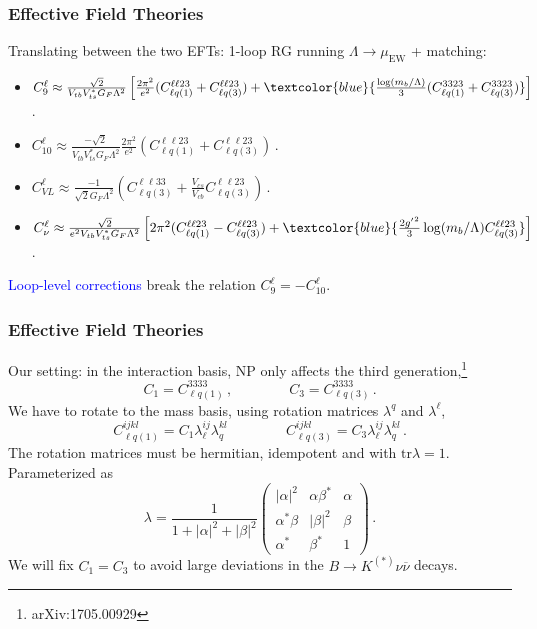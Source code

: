 \documentclass[mathserif, 10pt]{beamer}
\begin{document}
\begin{frame}
    \frametitle{Effective Field Theories}
    Translating between the two EFTs: 1-loop RG running $\Lambda \to \mu_\mathrm{EW}$ + matching:
    \begin{itemize}
        \item {\small $C_9^\ell \approx \frac{\sqrt{2}}{V_{tb}V_{ts}^* G_F \Lambda^2}\left[ \frac{2\pi^2}{e^2}(C_{\ell q(1)}^{\ell\ell23}+C_{\ell q(3)}^{\ell\ell23}) + \textcolor{blue}{\frac{\log(m_b/\Lambda)}{3}(C_{\ell q(1)}^{3323}+C_{\ell q(3)}^{3323})}\right]\, $.}
        \item {\small $C_{10}^\ell \approx \frac{-\sqrt{2}}{V_{tb}V_{ts}^* G_F \Lambda^2} \frac{2\pi^2}{e^2}(C_{\ell q(1)}^{\ell\ell23}+C_{\ell q(3)}^{\ell\ell23}) \, $.}
\item {\small $C_{VL}^\ell \approx \frac{-1}{\sqrt{2}G_F\Lambda^2}\left(C_{\ell q(3)}^{\ell\ell33}+ \frac{V_{cs}}{V_{cb}}C_{\ell q(3)}^{\ell\ell 23}\right)$\,.}
        \item {\small $C_\nu^\ell \approx \frac{\sqrt{2}}{e^2 V_{tb}V_{ts}^* G_F \Lambda^2}\left[2\pi^2(C_{\ell q(1)}^{\ell\ell 23}-C_{\ell q(3)}^{\ell\ell 23})+\textcolor{blue}{\frac{2{g'}^2}{3}\log(m_b/\Lambda)C_{\ell q(3)}^{\ell\ell 23}}\right]\,$.}
    \end{itemize}

\textcolor{blue}{Loop-level corrections} break the relation $C_9^\ell = -C_{10}^\ell$.

\end{frame}

\begin{frame}
    \frametitle{Effective Field Theories}

    Our setting: in the interaction basis, NP only affects the third generation,\footnote[1]{arXiv:1705.00929}
    $$C_1 = C_{\ell q(1)}^{3333}\,,\qquad\qquad C_3 = C_{\ell q(3)}^{3333}\,.$$
    We have to rotate to the mass basis, using rotation matrices $\lambda^q$ and $\lambda^\ell$,
    $$C_{\ell q(1)}^{ijkl} = C_1 \lambda_\ell^{ij}\lambda_q^{kl}\,\qquad\qquad C_{\ell q(3)}^{ijkl} = C_3 \lambda_\ell^{ij}\lambda_q^{kl}\,. $$
    The rotation matrices must be hermitian, idempotent and with $\mathrm{tr}\lambda =1$. Parameterized as
    $$ \lambda = \frac{1}{1+|\alpha|^2+|\beta|^2}\begin{pmatrix}
            |\alpha|^2 & \alpha \beta^* & \alpha \\ \alpha^* \beta & |\beta|^2 & \beta \\ \alpha^* & \beta^* & 1
        \end{pmatrix}\,. $$
    We will fix $C_1 = C_3$ to avoid large deviations in the $B\to K^{(*)}\nu\overline{\nu}$ decays.
\end{frame}
\end{document}

